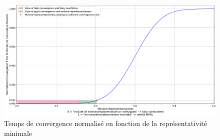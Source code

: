 \begin{figure}[h!]
  \centering
  \includegraphics[trim=0cm 0cm 0cm 0cm, clip, width=1.\linewidth]{figures/convergence_time_relative_to_representativeness.pdf}
  \caption{Temps de convergence normalisé en fonction de la représentativité minimale}
  \label{fig:conv_time_repr}
\end{figure}

